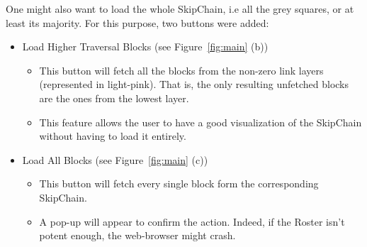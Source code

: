 \documentclass[11pt, a4paper, twoside, openright]{article} %
\begin{document}
{One might also want to load the whole SkipChain, i.e all the grey squares, or at least its majority. For this purpose, two buttons were added:
\begin{itemize}
    \item Load Higher Traversal Blocks (see Figure~\ref{fig:main} (b))
    \begin{itemize}
        \item This button will fetch all the blocks from the non-zero link layers (represented in light-pink). That is, the only resulting unfetched blocks are the ones from the lowest layer.
        \item This feature allows the user to have a good visualization of the SkipChain without having to load it entirely.
    \end{itemize}
    \item Load All Blocks (see Figure~\ref{fig:main} (c))
    \begin{itemize}
        \item This button will fetch every single block form the corresponding SkipChain.
        \item A pop-up will appear to confirm the action. Indeed, if the Roster isn't potent enough, the web-browser might crash.
    \end{itemize}
\end{itemize}


}
\end{document}
